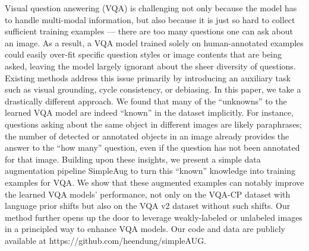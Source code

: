 Visual question answering (VQA) is challenging not only because the model has to handle multi-modal information, but also because it is just so hard to collect sufficient training examples --- there are too many questions one can ask about an image. As a result, a VQA model trained solely on human-annotated examples could easily over-fit specific question styles or image contents that are being asked, leaving the model largely ignorant about the sheer diversity of questions. Existing methods address this issue primarily by introducing an auxiliary task such as visual grounding, cycle consistency, or debiasing. In this paper, we take a drastically different approach. We found that many of the ``unknowns'' to the learned VQA model are indeed ``known'' in the dataset implicitly. For instance, questions asking about the same object in different images are likely paraphrases; the number of detected or annotated objects in an image already provides the answer to the ``how many'' question, even if the question has not been annotated for that image. Building upon these insights, we present a simple data augmentation pipeline SimpleAug to turn this ``known'' knowledge into training examples for VQA. We show that these augmented examples can notably improve the learned VQA models' performance, not only on the VQA-CP dataset with language prior shifts but also on the VQA v2 dataset without such shifts. Our method further opens up the door to leverage weakly-labeled or unlabeled images in a principled way to enhance VQA models. Our code and data are publicly available at https://github.com/heendung/simpleAUG.
